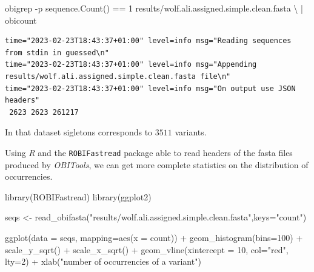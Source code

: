 \documentclass[
  letterpaper,
  DIV=11,
  numbers=noendperiod]{scrreprt}
\newenvironment{Shaded}{\begin{snugshade}}{\end{snugshade}}
\newcommand{\AttributeTok}[1]{\textcolor[rgb]{0.40,0.45,0.13}{#1}}
\newcommand{\DataTypeTok}[1]{\textcolor[rgb]{0.68,0.00,0.00}{#1}}
\newcommand{\DecValTok}[1]{\textcolor[rgb]{0.68,0.00,0.00}{#1}}
\newcommand{\ExtensionTok}[1]{\textcolor[rgb]{0.00,0.23,0.31}{#1}}
\newcommand{\FunctionTok}[1]{\textcolor[rgb]{0.28,0.35,0.67}{#1}}
\newcommand{\KeywordTok}[1]{\textcolor[rgb]{0.00,0.23,0.31}{#1}}
\newcommand{\NormalTok}[1]{\textcolor[rgb]{0.00,0.23,0.31}{#1}}
\newcommand{\OtherTok}[1]{\textcolor[rgb]{0.00,0.23,0.31}{#1}}
\newcommand{\SpecialCharTok}[1]{\textcolor[rgb]{0.37,0.37,0.37}{#1}}
\newcommand{\StringTok}[1]{\textcolor[rgb]{0.13,0.47,0.30}{#1}}
\begin{document}
\begin{Shaded}
\begin{Highlighting}[]
\ExtensionTok{obigrep} \AttributeTok{{-}p} \StringTok{\textquotesingle{}sequence.Count() == 1\textquotesingle{}}\NormalTok{ results/wolf.ali.assigned.simple.clean.fasta }\DataTypeTok{\textbackslash{}}
    \KeywordTok{|} \ExtensionTok{obicount}
\end{Highlighting}
\end{Shaded}

\begin{verbatim}
time="2023-02-23T18:43:37+01:00" level=info msg="Reading sequences from stdin in guessed\n"
time="2023-02-23T18:43:37+01:00" level=info msg="Appending results/wolf.ali.assigned.simple.clean.fasta file\n"
time="2023-02-23T18:43:37+01:00" level=info msg="On output use JSON headers"
 2623 2623 261217
\end{verbatim}

In that dataset sigletons corresponds to \(3511\) variants.

Using \emph{R} and the \texttt{ROBIFastread} package able to read
headers of the fasta files produced by \emph{OBITools}, we can get more
complete statistics on the distribution of occurrencies.

\begin{Shaded}
\begin{Highlighting}[]
\FunctionTok{library}\NormalTok{(ROBIFastread)}
\FunctionTok{library}\NormalTok{(ggplot2)}

\NormalTok{seqs }\OtherTok{\textless{}{-}} \FunctionTok{read\_obifasta}\NormalTok{(}\StringTok{"results/wolf.ali.assigned.simple.clean.fasta"}\NormalTok{,}\AttributeTok{keys=}\StringTok{"count"}\NormalTok{)}

\FunctionTok{ggplot}\NormalTok{(}\AttributeTok{data =}\NormalTok{ seqs,  }\AttributeTok{mapping=}\FunctionTok{aes}\NormalTok{(}\AttributeTok{x =}\NormalTok{ count)) }\SpecialCharTok{+}
  \FunctionTok{geom\_histogram}\NormalTok{(}\AttributeTok{bins=}\DecValTok{100}\NormalTok{) }\SpecialCharTok{+}
  \FunctionTok{scale\_y\_sqrt}\NormalTok{() }\SpecialCharTok{+}
  \FunctionTok{scale\_x\_sqrt}\NormalTok{() }\SpecialCharTok{+}
  \FunctionTok{geom\_vline}\NormalTok{(}\AttributeTok{xintercept =} \DecValTok{10}\NormalTok{, }\AttributeTok{col=}\StringTok{"red"}\NormalTok{, }\AttributeTok{lty=}\DecValTok{2}\NormalTok{) }\SpecialCharTok{+}
  \FunctionTok{xlab}\NormalTok{(}\StringTok{"number of occurrencies of a variant"}\NormalTok{) }
\end{Highlighting}
\end{Shaded}
\end{document}
